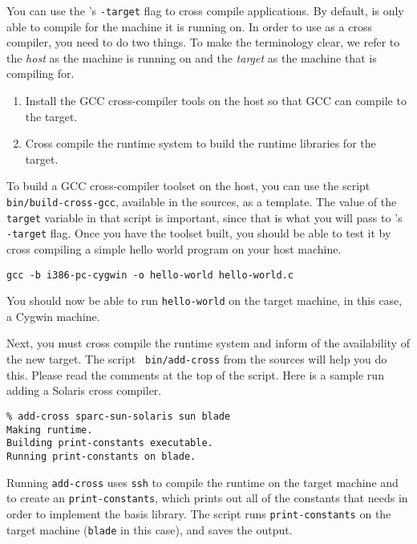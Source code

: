 %
You can use the {\mlton}'s {\tt -target} flag to cross compile
applications.  By default, {\mlton} is only able to compile for the
machine it is running on.  In order to use {\mlton} as a cross
compiler, you need to do two things.  To make the terminology clear,
we refer to the {\em host} as the machine {\mlton} is running on and
the {\em target} as the machine that {\mlton} is compiling for.

\begin{enumerate}

\item Install the GCC cross-compiler tools on the host so that GCC can
compile to the target.

\item Cross compile the {\mlton} runtime system to build the runtime
libraries for the target.

\end{enumerate}

To build a GCC cross-compiler toolset on the host, you can use the
script {\tt bin/build-cross-gcc}, available in the {\mlton} sources,
as a template.  The value of the {\tt target} variable in that script
is important, since that is what you will pass to {\mlton}'s {\tt
-target} flag.  Once you have the toolset built, you should be able to
test it by cross compiling a simple hello world program on your host
machine.
\begin{verbatim}
gcc -b i386-pc-cygwin -o hello-world hello-world.c
\end{verbatim}
You should now be able to run {\tt hello-world} on the target machine,
in this case, a Cygwin machine.

Next, you must cross compile the {\mlton} runtime system and inform
{\mlton} of the availability of the new target.  The script {\tt
bin/add-cross} from the {\mlton} sources will help you do this.
Please read the comments at the top of the script.  Here is a sample
run adding a Solaris cross compiler.
\begin{verbatim}
% add-cross sparc-sun-solaris sun blade
Making runtime.
Building print-constants executable.
Running print-constants on blade.
\end{verbatim}
Running {\tt add-cross} uses {\tt ssh} to compile the runtime on the
target machine and to create an {\tt print-constants}, which prints
out all of the constants that {\mlton} needs in order to implement the
basis library.  The script runs {\tt print-constants} on the target
machine ({\tt blade} in this case), and saves the output.

